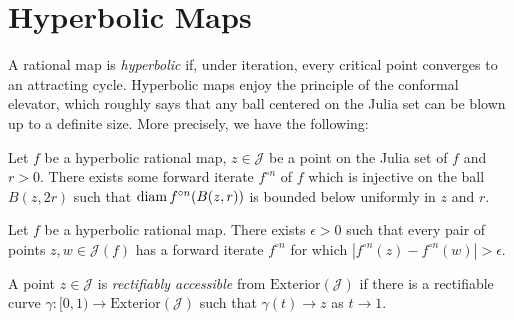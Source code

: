 \begin{comment}
\begin{proof}
Formally, $\overline{\psi}(\overline{z})$
	is another conformal conjugacy between $f$ and $f_0$ which fixes infinity, so by the uniqueness of the Böttcher coordinate we obtain $\psi(z)=\overline{\psi}(\overline{z})$,
	hence $\psi(z)\in\R$ for $z\in\R$.
\end{proof}
\end{comment}

\section{Hyperbolic Maps}

A rational map is \emph{hyperbolic} if, under iteration, every critical point converges to an attracting cycle.
Hyperbolic maps enjoy the principle of the conformal elevator, which roughly says that any ball centered on the Julia set can be blown up to a definite size. More precisely, we have the following:

\begin{proposition} \label{elevator}
	Let $f$ be a hyperbolic rational map, $z\in \mathcal J$ be a point on the Julia set of $f$ and $r>0$. There exists some forward iterate $f^{\circ n}$ of $f$ which is injective on the ball $B(z,2r)$ such that
	$\operatorname{diam} {f^{\circ n}(B(z,r))}$ is bounded below uniformly in $z$ and $r$. 
\end{proposition}


\begin{corollary} \label{elevator for points on julia}
	Let $f$ be a hyperbolic rational map. There exists  $\epsilon > 0$ such that every pair of points $z,w\in\mathcal{J}(f)$ has a forward iterate $f^{\circ n}$ for which $\left|f^{\circ n}(z)-f^{\circ n}(w)\right|>\epsilon$.	
\end{corollary}

\begin{definition}
	A point $z \in \mathcal J$ is \emph{rectifiably accessible} from $\mathrm{Exterior}(\mathcal J)$ if there is a rectifiable curve $\gamma: [0,1) \to \mathrm{Exterior}(\mathcal J)$ such that $\gamma (t) \to z$ as $t \to 1$.
\end{definition}

\begin{comment}
\begin{proof}
	Apply \cref{elevator} to a ball centered on the Julia set which contains $z,w$ on its boundary at roughly antipodal points. After blowing up we get points $f^{\circ n}(z),f^{\circ n}(w)$ which are a definite distance apart by Koebe's distortion theorem. %
\end{proof}
\end{comment}

